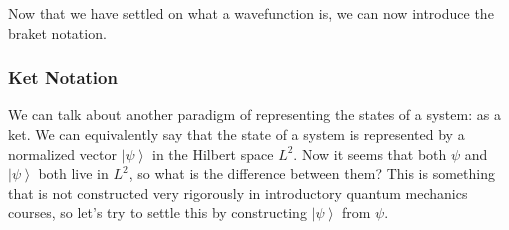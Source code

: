 \documentclass{article}
\newcommand{\ket}[1]{\ensuremath{\left|#1\right\rangle}}
\theoremstyle{definition}
\begin{document}
    Now that we have settled on what a wavefunction is, we can now introduce the braket notation. 

    \subsubsection{Ket Notation} 

      We can talk about another paradigm of representing the states of a system: as a ket. We can equivalently say that the state of a system is represented by a normalized vector $\ket{\psi}$ in the Hilbert space $L^2$. Now it seems that both $\psi$ and $\ket{\psi}$ both live in $L^2$, so what is the difference between them? This is something that is not constructed very rigorously in introductory quantum mechanics courses, so let's try to settle this by constructing $\ket{\psi}$ from $\psi$. 
\end{document}
